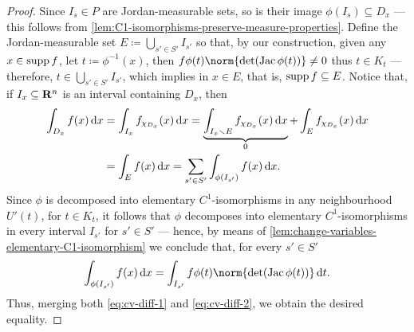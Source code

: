 \begin{proof}
Since \(I_s \in P\) are Jordan-measurable sets, so is their image \(\phi(I_s)
\subseteq D_x\) --- this follows from
\cref{lem:C1-isomorphisms-preserve-measure-properties}. Define the
Jordan-measurable set \(E \coloneq \bigcup_{s' \in S'} I_{s'}\) so that, by our
construction, given any \(x \in \operatorname{supp} f\), let \(t \coloneq \phi^{-1}(x)\), then
\(f\phi(t) \norm{\det(\Jac \phi(t))} \neq 0\) thus \(t \in K_t\) --- therefore,
\(t \in \bigcup_{s' \in S'} I_{s'}\), which implies in \(x \in E\), that is,
\(\operatorname{supp} f \subseteq E\). Notice that, if \(I_x \subseteq \mathbf{R}^n\) is an interval
containing \(D_x\), then
\begin{align}
  \nonumber
  \int_{D_x} f(x)\, \mathrm{d} x
  &= \int_{I_x} f_{\chi_{D_x}}(x)\, \mathrm{d} x
  = \underbrace{\int_{I_x \smallsetminus E} f_{\chi_{D_x}}(x)\, \mathrm{d} x}_0
  + \int_E f_{\chi_{D_x}}(x)\, \mathrm{d} x \\
  \label{eq:cv-diff-1}
  &= \int_E f(x)\, \mathrm{d} x
  = \sum_{s' \in S'} \int_{\phi(I_{s'})} f(x)\, \mathrm{d} x.
\end{align}
Since \(\phi\) is decomposed into elementary \(C^1\)-isomorphisms in
any neighbourhood \(U'(t)\), for \(t \in K_t\), it follows that \(\phi\)
decomposes into elementary \(C^1\)-isomorphisms in every interval \(I_{s'}\) for
\(s' \in S'\) --- hence, by means of
\cref{lem:change-variables-elementary-C1-isomorphism} we conclude that, for
every \(s' \in S'\)
\begin{equation}
\label{eq:cv-diff-2}
  \int_{\phi(I_{s'})} f(x)\, \diff x = \int_{I_{s'}} f\phi(t) \norm{\det(\Jac
    \phi(t))}\, \diff t.
\end{equation}
Thus, merging both \cref{eq:cv-diff-1} and \cref{eq:cv-diff-2}, we obtain the
desired equality.
\end{proof}


